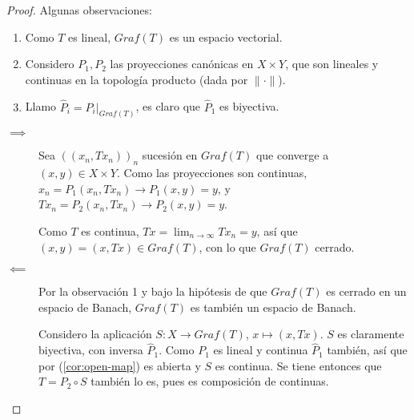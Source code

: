 \begin{proof}

  Algunas observaciones:

  \begin{enumerate}
    \item Como $T$ es lineal, $Graf(T)$ es un espacio vectorial.
    \item Considero $P_1,P_2$ las proyecciones canónicas en $X \times Y$, que
      son lineales y continuas en la topología producto (dada por $\|\cdot \|$).
    \item Llamo $\hat{P}_i=P_i|_{Graf(T)}$, es claro que $\hat{P}_1$ es
      biyectiva.
  \end{enumerate}

  \begin{description}
    \item[$\mathbf{\implies}$] Sea $((x_n,Tx_n))_n$ sucesión en $Graf(T)$ que
      converge a $(x,y)\in X \times Y$. Como las proyecciones son continuas,
      $x_n=P_1(x_n,Tx_n)\to P_1(x,y)=y$, y $Tx_n=P_2(x_n,Tx_n)\to P_2(x,y)=y$.

      Como $T$ es continua, $Tx = \lim_{n \to \infty} Tx_n=y$, así que
      $(x,y)=(x,Tx)\in Graf(T)$, con lo que $Graf(T)$ cerrado.

    \item[$\mathbf{\impliedby}$] Por la observación 1 y bajo la hipótesis de que
      $Graf(T)$ es cerrado en un espacio de Banach, $Graf(T)$ es también un
      espacio de Banach.

      Considero la aplicación $S:X\to Graf(T)$, $x\mapsto (x,Tx)$. $S$ es
      claramente biyectiva, con inversa $\hat{P}_1$. Como $P_1$ es lineal y
      continua $\hat{P}_1$ también, así que por (\autoref{cor:open-map}) es
      abierta y $S$ es continua. Se tiene entonces que $T=P_2\circ S$ también lo
      es, pues es composición de continuas.
  \end{description}

\end{proof}

